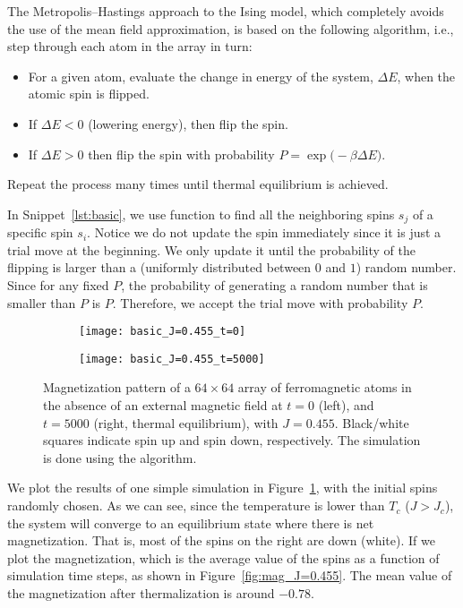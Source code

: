 The Metropolis--Hastings approach to the Ising model, which completely avoids the use of the mean
field approximation, is based on the following algorithm, i.e.,
step through each atom in the array in turn:
%
\begin{itemize}
    \item For a given atom, evaluate the change in energy of the system, \(\Delta E\), when
          the atomic spin is flipped.
    \item If \(\Delta E < 0\) (lowering energy), then flip the spin.
    \item If \(\Delta E > 0\) then flip the spin with probability
          \(P=\exp\bigl(-\beta \Delta E\bigr)\).
\end{itemize}
%
Repeat the process many times until thermal equilibrium is achieved.

In Snippet~\ref{lst:basic}, we use function  to find all the neighboring
spins \(s_j\) of a specific spin \(s_i\). Notice we do not update the spin immediately
since it is just a trial move at the beginning. We only update it until the probability of
the flipping is larger than a (uniformly distributed between \(0\) and \(1\)) random number.
Since for any fixed \(P\), the probability of generating a random number that is smaller
than \(P\) is \(P\). Therefore, we accept the trial move with probability \(P\).

\begin{figure}[H]
    \centering
    \begin{subfigure}{0.49\textwidth}
        \centering
        \texttt{[image: basic\_J=0.455\_t=0]}
    \end{subfigure}
    \hfill
    \begin{subfigure}{0.49\textwidth}
        \centering
        \texttt{[image: basic\_J=0.455\_t=5000]}
    \end{subfigure}
    \caption{Magnetization pattern of a \(64 \times 64\) array of ferromagnetic atoms in the
        absence of an external magnetic field at \(t = 0\) (left), and \(t = 5000\) (right,
        thermal equilibrium), with \(J = 0.455\). Black/white squares indicate spin up and
        spin down, respectively. The simulation is done using the  algorithm.}
    \label{fig:rand_J=0.455}
\end{figure}

We plot the results of one simple simulation in Figure~\ref{fig:rand_J=0.455},
with the initial spins randomly chosen.
As we can see, since the temperature is lower than \(T_c\) (\(J > J_c\)),
the system will converge to an equilibrium state where there is net magnetization.
That is, most of the spins on the right are down (white).
If we plot the magnetization, which is the average value of the spins as a function
of simulation time steps, as shown in Figure~\ref{fig:mag_J=0.455}.
The mean value of the magnetization after thermalization is around \(-0.78\).

